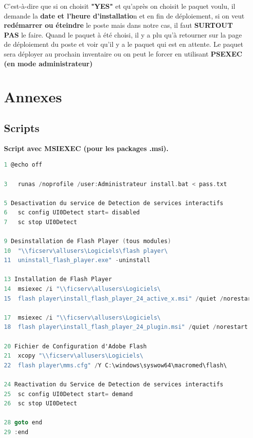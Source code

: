 \documentclass[11pt,a4paper,oneside]{article}
\begin{document}
C'est-à-dire que si on choisit \textbf{"YES"} et qu'après on choisit le paquet voulu, il demande la \textbf{date et l'heure d'installatio}n et en fin de déploiement, si on veut \textbf{redémarrer ou éteindre} le poste mais dans notre cas, il faut \textbf{SURTOUT PAS} le faire. Quand le paquet à été choisi, il y a plu qu'à retourner sur la page de déploiement du poste et voir qu'il y a le paquet qui est en attente. Le paquet sera déployer au prochain inventaire ou on peut le forcer en utilisant \textbf{PSEXEC (en mode administrateur)}
\newpage
\section{Annexes}
\subsection{Scripts}
\textbf{Script avec MSIEXEC (pour les packages .msi).}
\begin{lstlisting}[language=C]
1 @echo off

3	runas /noprofile /user:Administrateur install.bat < pass.txt

5 Desactivation du service de Detection de services interactifs
6	sc config UI0Detect start= disabled
7	sc stop UI0Detect

9 Desinstallation de Flash Player (tous modules)
10	"\\ficserv\allusers\Logiciels\flash player\
11	uninstall_flash_player.exe" -uninstall

13 Installation de Flash Player
14	msiexec /i "\\ficserv\allusers\Logiciels\
15	flash player\install_flash_player_24_active_x.msi" /quiet /norestart
	
17	msiexec /i "\\ficserv\allusers\Logiciels\
18	flash player\install_flash_player_24_plugin.msi" /quiet /norestart

20 Fichier de Configuration d'Adobe Flash 
21	xcopy "\\ficserv\allusers\Logiciels\
22	flash player\mms.cfg" /Y C:\windows\syswow64\macromed\flash\ 

24 Reactivation du Service de Detection de services interactifs
25	sc config UI0Detect start= demand
26	sc stop UI0Detect

28 goto end
29 :end
\end{lstlisting}
\end{document}
